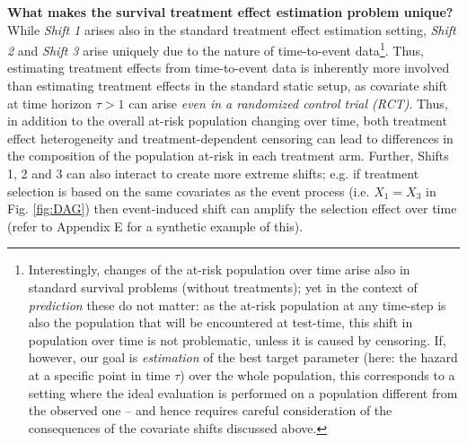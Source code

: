 \documentclass{article}
\begin{document}
\textbf{What makes the survival treatment effect estimation problem unique?} While \textit{Shift 1} arises also in the standard treatment effect estimation setting, \textit{Shift 2} and \textit{Shift 3} arise uniquely due to the nature of time-to-event data\footnote{Interestingly, changes of the at-risk population over time arise also in standard survival problems (without treatments); yet in the context of \textit{prediction} these do not matter: as the at-risk population at any time-step is also the population that will be encountered at test-time, this shift in population over time is not problematic, unless it is caused by censoring. If, however, our goal is \textit{estimation} of the best target parameter (here: the hazard at a specific point in time $\tau$) over the whole population, this corresponds to a setting where the ideal evaluation is performed on a population different from the observed one  -- and hence requires careful consideration of the consequences of the covariate shifts discussed above.}. Thus, estimating treatment effects from time-to-event data is inherently more involved than estimating treatment effects in the standard static setup, as covariate shift at time horizon $\tau>1$ can arise \textit{even in a randomized control trial (RCT)}. Thus, in addition to the overall at-risk population changing over time, both treatment effect heterogeneity and treatment-dependent censoring can lead to differences in the composition of the population at-risk in each treatment arm. Further, Shifts 1, 2 and 3 can also interact to create more extreme shifts; e.g. if treatment selection is based on the same covariates as the event process (i.e. $X_1=X_3$ in Fig. \ref{fig:DAG}) then event-induced shift can amplify the selection effect over time (refer to Appendix E for a synthetic example of this).
\end{document}
